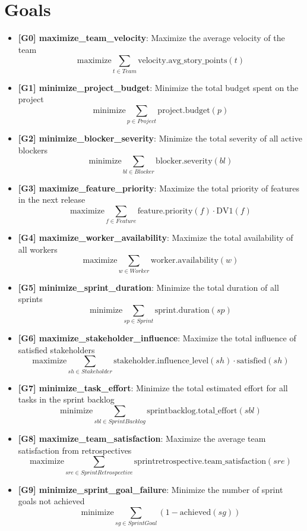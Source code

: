 \documentclass{article}
\begin{document}
\section{Goals}
\begin{itemize}
    \item \textbf{[G0] maximize\_team\_velocity}: Maximize the average velocity of the team
        \[ \text{maximize} \sum_{t \in Team} \text{velocity.avg\_story\_points}(t) \]
    \item \textbf{[G1] minimize\_project\_budget}: Minimize the total budget spent on the project
        \[ \text{minimize} \sum_{p \in Project} \text{project.budget}(p) \]
    \item \textbf{[G2] minimize\_blocker\_severity}: Minimize the total severity of all active blockers
        \[ \text{minimize} \sum_{bl \in Blocker} \text{blocker.severity}(bl) \]
    \item \textbf{[G3] maximize\_feature\_priority}: Maximize the total priority of features in the next release
        \[ \text{maximize} \sum_{f \in Feature} \text{feature.priority}(f) \cdot \text{DV1}(f) \]
    \item \textbf{[G4] maximize\_worker\_availability}: Maximize the total availability of all workers
        \[ \text{maximize} \sum_{w \in Worker} \text{worker.availability}(w) \]
    \item \textbf{[G5] minimize\_sprint\_duration}: Minimize the total duration of all sprints
        \[ \text{minimize} \sum_{sp \in Sprint} \text{sprint.duration}(sp) \]
    \item \textbf{[G6] maximize\_stakeholder\_influence}: Maximize the total influence of satisfied stakeholders
        \[ \text{maximize} \sum_{sh \in Stakeholder} \text{stakeholder.influence\_level}(sh) \cdot \text{satisfied}(sh) \]
    \item \textbf{[G7] minimize\_task\_effort}: Minimize the total estimated effort for all tasks in the sprint backlog
        \[ \text{minimize} \sum_{sbl \in SprintBacklog} \text{sprintbacklog.total\_effort}(sbl) \]
    \item \textbf{[G8] maximize\_team\_satisfaction}: Maximize the average team satisfaction from retrospectives
        \[ \text{maximize} \sum_{sre \in SprintRetrospective} \text{sprintretrospective.team\_satisfaction}(sre) \]
    \item \textbf{[G9] minimize\_sprint\_goal\_failure}: Minimize the number of sprint goals not achieved
        \[ \text{minimize} \sum_{sg \in SprintGoal} (1 - \text{achieved}(sg)) \]
\end{itemize}
\end{document}
